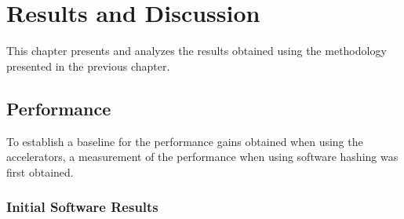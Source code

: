 \chapter{Results and Discussion}

This chapter presents and analyzes the results obtained using the methodology
presented in the previous chapter.

\section{Performance}


 
To establish a baseline for the performance gains obtained when using the accelerators,
a measurement of the performance when using software hashing was first obtained.

\subsection{Initial Software Results}

